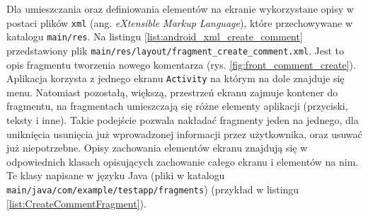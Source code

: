 Dla umieszczania oraz definiowania elementów na ekranie wykorzystane opisy w postaci plików \texttt{xml} (ang. \textit{eXtensible Markup Language}), które przechowywane w katalogu \texttt{main/res}. Na listingu \ref{list:android_xml_create_comment} przedstawiony plik \texttt{main/res/layout/fragment\_create\_comment.xml}.
Jest to opis fragmentu tworzenia nowego komentarza (rys. \ref{fig:front_comment_create}). Aplikacja korzysta z jednego ekranu \texttt{Activity} na którym na dole znajduje się menu. Natomiast pozostałą, większą, przestrzeń ekranu zajmuje kontener do fragmentu, na fragmentach umieszczają się różne elementy aplikacji (przyciski, teksty i inne).
Takie podejście pozwala nakładać fragmenty jeden na jednego, dla uniknięcia usunięcia już wprowadzonej informacji przez użytkownika, oraz usuwać już niepotrzebne. Opisy zachowania elementów ekranu znajdują się w odpowiednich klasach opisujących zachowanie całego ekranu i elementów na nim. Te klasy napisane w języku Java (pliki w katalogu \texttt{main/java/com/example/testapp/fragments}) (przykład w listingu \ref{list:CreateCommentFragment}).
